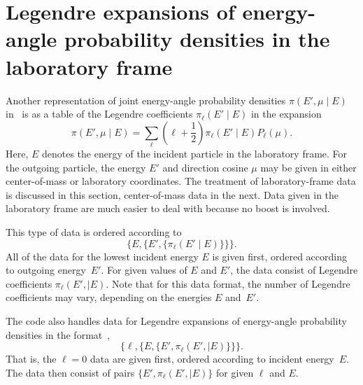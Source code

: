 \chapter{Legendre expansions of energy-angle probability densities
in the laboratory frame}
\label{Sec:Legendre-lab}
Another representation of joint energy-angle probability densities
$\pi(E', \mu \mid E)$ in \xendl\ is as a table of the Legendre 
coefficients $\pi_\ell(E' \mid E)$ in the expansion
\begin{equation}
  \pi( E', \mu \mid E) = \sum_\ell
  \left(
    \ell + \frac{1}{2}
  \right)
  \pi_\ell( E' \mid E) P_\ell( \mu ).
 \label{piLegendre}
\end{equation}
Here, $E$ denotes the energy of the incident particle in the
laboratory frame.  For the outgoing particle, the energy $E'$ and 
direction cosine $\mu$ may be given in either center-of-mass or laboratory
coordinates.  The treatment of laboratory-frame data is discussed in this section, 
center-of-mass data in the next.  Data given in the laboratory frame are
much easier to deal with because no boost is involved.

This type of data is ordered according to
\begin{equation}
\{ E, \{ E', \{ \pi_\ell(E' \mid E) \} \} \}.
 \label{ENDF-I4}
\end{equation}
All of the data for the lowest incident energy $E$
is given first, ordered according to outgoing energy~$E'$.  For
given values of $E$ and $E'$, the data consist of Legendre coefficients
$\pi_\ell(E', \mid E)$.  Note that for this data format, the number
of Legendre coefficients may vary, depending on the energies $E$ and~$E'$.

The {\gettransfer} code also handles data for Legendre expansions of
energy-angle probability densities in the {\ENDL} format~\cite{Omega},
\begin{equation}
\{ \ell, \{ E, \{ E', \pi_\ell(E', \mid E) \} \} \}.
 \label{ENDL-I4}
\end{equation}
That is, the $\ell = 0$ data are given first, ordered according to
incident energy~$E$.  The data then consist of pairs
$\{ E', \pi_\ell(E', \mid E) \}$ for given $\ell$ and $E$.

